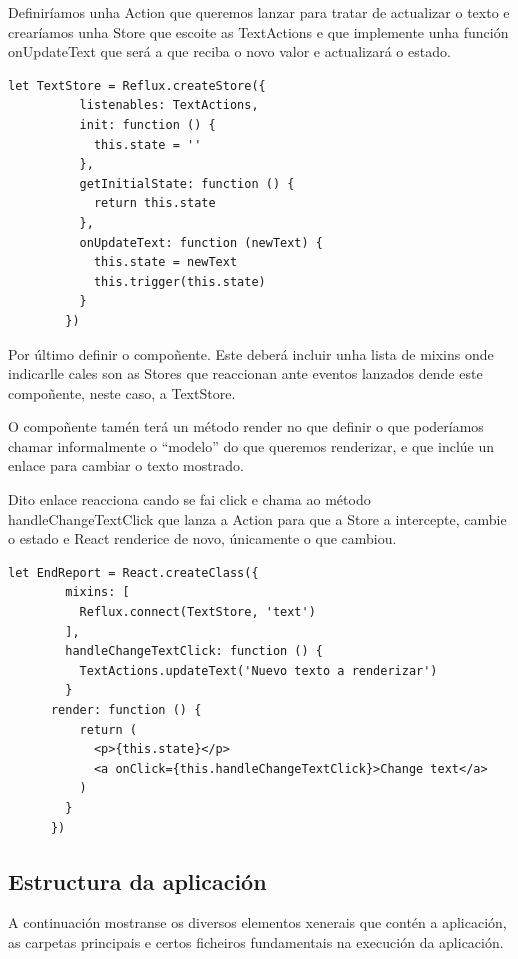     Definiríamos unha Action que queremos lanzar para tratar de actualizar o 
texto e crearíamos unha Store que escoite as TextActions e que implemente unha 
función onUpdateText que será a que reciba o novo valor e actualizará o estado.

     \begin{lstlisting}[frame=single]
        let TextStore = Reflux.createStore({
          listenables: TextActions,
          init: function () {
            this.state = ''
          },
          getInitialState: function () {
            return this.state
          },
          onUpdateText: function (newText) {
            this.state = newText
            this.trigger(this.state)
          }
        })
    \end{lstlisting}

    Por último definir o compoñente. Este deberá incluir unha lista de mixins 
onde indicarlle cales son as Stores que reaccionan ante eventos lanzados 
dende este compoñente, neste caso, a TextStore.

    O compoñente tamén terá un método render no que definir o que poderíamos 
chamar informalmente o ``modelo'' do que queremos renderizar, e que inclúe un 
enlace para cambiar o texto mostrado.

    Dito enlace reacciona cando se fai click e chama ao método 
handleChangeTextClick que lanza a Action para que a Store a intercepte, cambie 
o estado e React renderice de novo, únicamente o que cambiou.


     \begin{lstlisting}[frame=single]
      let EndReport = React.createClass({
        mixins: [
          Reflux.connect(TextStore, 'text')
        ],
        handleChangeTextClick: function () {
          TextActions.updateText('Nuevo texto a renderizar')
        }
      render: function () {
          return (
            <p>{this.state}</p>
            <a onClick={this.handleChangeTextClick}>Change text</a>
          )
        }
      })
    \end{lstlisting}


    \subsection{Estructura da aplicación}

    A continuación mostranse os diversos elementos xenerais que contén a 
aplicación, as carpetas principais e certos ficheiros fundamentais na execución 
da aplicación.

